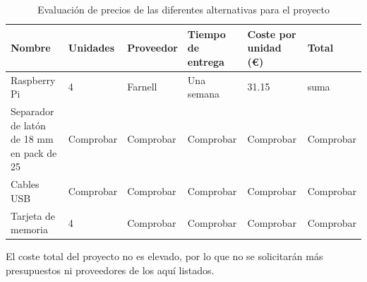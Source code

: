 
\begin{table}[H]
\begin{tabular}{|p{2.5cm}|p{2cm}|p{2cm}|p{2.5cm}|p{2.5cm}|p{2.5cm}|}
\hline
\textbf{Nombre} & \textbf{Unidades} & \textbf{Proveedor} & \textbf{Tiempo de entrega} & \textbf{Coste por unidad (€)} & \textbf{Total}\\ \hline
Raspberry Pi & 4 & Farnell & Una semana & 31.15 & suma\\ \hline

Separador de latón de 18 mm en pack de 25 & Comprobar & Comprobar & Comprobar & Comprobar & Comprobar\\ \hline
Cables USB & Comprobar & Comprobar & Comprobar & Comprobar & Comprobar\\ \hline
Tarjeta de memoria & 4 & Comprobar & Comprobar & Comprobar & Comprobar\\ \hline


\end{tabular}
\caption[Evaluación de precios de las diferentes alternativas para el proyecto]{Evaluación de precios de las diferentes alternativas para el proyecto}
\end{table}


El coste total del proyecto no es elevado, por lo que no se solicitarán más presupuestos ni proveedores de los aquí listados.